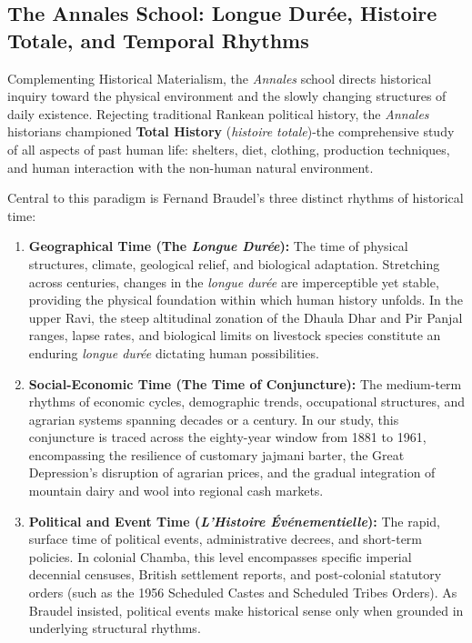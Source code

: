 \documentclass[11pt,a4paper]{article}
\begin{document}
\subsection{The Annales School: Longue Dur\'ee, Histoire Totale, and Temporal Rhythms}
Complementing Historical Materialism, the \textit{Annales} school directs historical inquiry toward the physical environment and the slowly changing structures of daily existence. Rejecting traditional Rankean political history, the \textit{Annales} historians championed \textbf{Total History} (\textit{histoire totale})-the comprehensive study of all aspects of past human life: shelters, diet, clothing, production techniques, and human interaction with the non-human natural environment.

Central to this paradigm is Fernand Braudel's three distinct rhythms of historical time:
\begin{enumerate}[leftmargin=*]
    \item \textbf{Geographical Time (The \textit{Longue Dur\'ee}):} The time of physical structures, climate, geological relief, and biological adaptation. Stretching across centuries, changes in the \textit{longue dur\'ee} are imperceptible yet stable, providing the physical foundation within which human history unfolds. In the upper Ravi, the steep altitudinal zonation of the Dhaula Dhar and Pir Panjal ranges, lapse rates, and biological limits on livestock species constitute an enduring \textit{longue dur\'ee} dictating human possibilities.
    \item \textbf{Social-Economic Time (The Time of Conjuncture):} The medium-term rhythms of economic cycles, demographic trends, occupational structures, and agrarian systems spanning decades or a century. In our study, this conjuncture is traced across the eighty-year window from 1881 to 1961, encompassing the resilience of customary jajmani barter, the Great Depression's disruption of agrarian prices, and the gradual integration of mountain dairy and wool into regional cash markets.
    \item \textbf{Political and Event Time (\textit{L'Histoire \'Ev\'enementielle}):} The rapid, surface time of political events, administrative decrees, and short-term policies. In colonial Chamba, this level encompasses specific imperial decennial censuses, British settlement reports, and post-colonial statutory orders (such as the 1956 Scheduled Castes and Scheduled Tribes Orders). As Braudel insisted, political events make historical sense only when grounded in underlying structural rhythms.
\end{enumerate}
\end{document}
